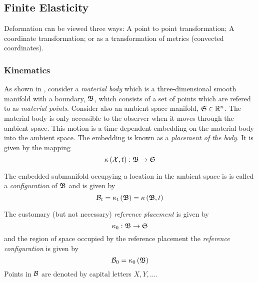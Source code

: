  
\subsection{Finite Elasticity}
\label{subsec:FiniteElasticity}

Deformation can be viewed three ways: A point to point transformation; A
coordinate transformation; or as a transformation of metrics (convected coordinates).

\subsubsection{Kinematics}

As shown in , consider a \textit{material
  body} which is a three-dimensional smooth manifold with a boundary, $ \mathfrak{B} $,
which consists of a set of points which are refered to as \textit{material
  points}. Consider also an ambient space manifold,
$\manifold{S}\in\rntopology{n}$. The material body is only accessible to
the observer when it moves through the ambient space. This motion is a
time-dependent embedding on the material body into the ambient space. The
embedding is known as a \textit{placement of the body}. It is given by the
mapping
\begin{equation}
   \kappa\left( \mathcal{X},t \right) : \mathfrak{B} \rightarrow \mathfrak{S} 
\end{equation}

The embedded submanifold occupying a location in the ambient space is is
called a \textit{configuration} of $ \mathfrak{B} $ and is given by
\begin{equation}
   \mathcal{B} _{t}= \kappa_{t}\left(  \mathfrak{B}  \right) = \kappa\left(  \mathfrak{B} ,t \right) 
\end{equation}

The customary (but not necessary) \textit{reference placement} is given by
\begin{equation}
  \kappa_{0}: \mathfrak{B} \rightarrow \mathfrak{S} 
\end{equation}
and the region of space occupied by the reference placement \ie the
\textit{reference configuration} is given by
\begin{equation}
   \mathcal{B} _{0}= \kappa_{0}\left(  \mathfrak{B}  \right) 
\end{equation}
Points in $ \mathcal{B} $ are denoted by capital letters \ie $X, Y,
\ldots$.


